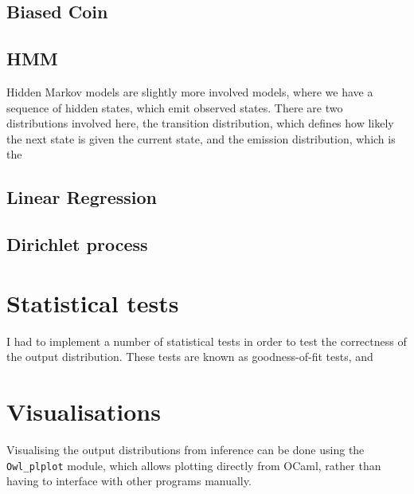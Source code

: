 \subsection{Biased Coin}

\subsection{HMM}
Hidden Markov models are slightly more involved models, where we have a sequence of hidden states, which emit observed states. There are two distributions involved here, the transition distribution, which defines how likely the next state is given the current state, and the emission distribution, which is the 

\subsection{Linear Regression}

\subsection{Dirichlet process}


\section{Statistical tests}
I had to implement a number of statistical tests in order to test the correctness of the output distribution. These tests are known as goodness-of-fit tests, and 

\section{Visualisations}
Visualising the output distributions from inference can be done using the \texttt{Owl\_plplot} module, which allows plotting directly from OCaml, rather than having to interface with other programs manually.
